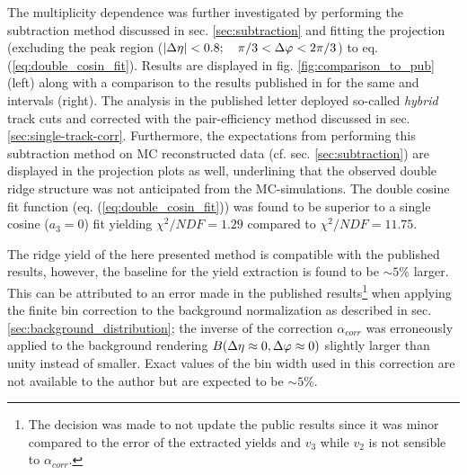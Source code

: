 The multiplicity dependence was further investigated by performing the subtraction method discussed in sec. \ref{sec:subtraction} and fitting the \dphi projection (excluding the peak region ($|\Delta\eta| < 0.8;  \quad \pi /3 < \Delta\varphi < 2 \pi /3$) to eq. (\ref{eq:double_cosin_fit}). Results are displayed in fig. \ref{fig:comparison_to_pub} (left) along with a comparison to the results published in \cite{Abelev2012} for the same \ptassoc and \pttrig intervals (right). The analysis in the published letter deployed so-called \emph{hybrid} track cuts and corrected with the pair-efficiency method discussed in sec. \ref{sec:single-track-corr}. Furthermore, the expectations from performing this subtraction method on MC reconstructed data (cf. sec. \ref{sec:subtraction}) are displayed in the projection plots as well, underlining that the observed double ridge structure was not anticipated from the MC-simulations. The double cosine fit function (eq. (\ref{eq:double_cosin_fit})) was found to be superior to a single cosine ($a_3 = 0$) fit yielding $\chi ^2 / NDF = 1.29$ compared to $\chi^2 / NDF = 11.75$.

The ridge yield of the here presented method is compatible with the published results, however, the baseline for the yield extraction is found to be  $\sim 5\%$ larger. This can be attributed to an error made in the published results\footnote{The decision was made to not update the public results since it was minor compared to the error of the extracted yields and $v_3$ while $v_2$ is not sensible to $\alpha_{corr}$.}  when applying the finite bin correction to the background normalization as described in sec. \ref{sec:background_distribution}; the inverse of the correction $\alpha_{corr}$ was erroneously applied to the background rendering $B(\Delta\eta \approx 0, \Delta\varphi \approx 0)$ slightly larger than unity instead of smaller. Exact values of the bin width used in this correction are not available to the author but are expected to be $\sim 5\%$.

